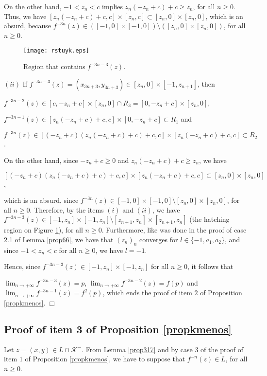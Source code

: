 \documentclass[11pt]{amsart}
\theoremstyle{definition}
\begin{document}
	On the other hand, $-1<z_n<c$ implies $z_n(-z_n+c)+c\geq z_n$, for all $n\geq 0$. Thus, we have $[z_n(-z_n+c)+c,c]\times[z_n,c]\subset[z_n,0]\times[z_n,0]$, which is an absurd, because  $f^{-3n}(z)\in ([-1,0]\times[-1,0])\setminus ([z_n,0]\times [z_n,0])$, for all $n\geq 0$.
	
	\begin{figure}[!h]
		\centering
		\texttt{[image: rstuyk.eps]}
		\caption{Region that contains $f^{-3n-3}(z)$.}
		\label{figrstuyk}
	\end{figure}
	
	\noindent $(ii)$ If $f^{-3n-3}(z)=(x_{3n+3},y_{3n+3})\in
	[z_n,0]\times[-1,z_{n+1}]$, then
	
\smallskip 
	
\noindent $f^{-3n-2}(z)\in [c,-z_n+c]\times[z_n,0]\cap R_3= [0,-z_n+c]\times[z_n,0]$,

\noindent $f^{-3n-1}(z)\in [z_n(-z_n+c)+c,c]\times[0,-z_n+c] \subset R_1$ and

\noindent $f^{-3n}(z)\in [(-z_n+c)(z_n(-z_n+c)+c)+c,c]\times[z_n(-z_n+c)+c,c]\subset R_2$.

\smallskip

	On the other hand, since $-z_n+c\geq 0$ and $z_n(-z_n+c)+c\geq z_n$, we have

	\begin{center}
		$[(-z_n+c)(z_n(-z_n+c)+c)+c,c]\times[z_n(-z_n+c)+c,c] \subset[z_n,0]\times[z_n,0]$,
	\end{center}
	
	\noindent which is an absurd, since $f^{-3n}(z)\in
	[-1,0]\times[-1,0]\setminus [z_n,0]\times [z_n,0]$, for all $n\geq 0$.
	Therefore, by the items $(i)$ and $(ii)$, we have
	$f^{-3n-3}(z)\in [-1,z_n]\times
	[-1,z_n]\setminus[z_{n+1},z_n]\times[z_{n+1},z_n]$ (the hatching region
	on Figure \ref{figrstuyk}), for all $n\geq 0$. Furthermore, like was done in the proof of case 2.1 of Lemma \ref{prop66}, we have that $(z_n)_n$ converges for $l\in\{-1,a_1,a_2\}$, and since $-1<z_n<c$ for all $n\geq 0$, we have $l=-1$.
	
	Hence, since $f^{-3n-3}(z)\in [-1,z_n]\times [-1,z_n]$ for all $n\geq 0$, it follows that

\noindent $\displaystyle\lim_{n\to+\infty} f^{-3n-3}(z)=p$, $\displaystyle\lim_{n\to+\infty} f^{-3n-2}(z)=f(p)$ and
$\displaystyle\lim_{n\to+\infty} f^{-3n-1}(z)=f^2(p)$, which ends the proof of item $2$ of Proposition \ref{propkmenos}. \hfill $\Box$


\subsection{Proof of item 3 of Proposition \ref{propkmenos}} \label{trespropkmenos}
Let $z=(x,y)\in L\cap \mathcal{K}^-$. From Lemma \ref{prop317} and
by case $3$ of the proof of item $1$ of Proposition \ref{propkmenos}, we have to
suppose that $f^{-n}(z)\in L$, for all $n\geq 0$.
\end{document}
